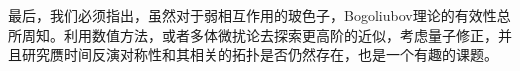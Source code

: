 最后，我们必须指出，虽然对于弱相互作用的玻色子，Bogoliubov理论的有效性总所周知。利用数值方法，或者多体微扰论去探索更高阶的近似，考虑量子修正，并且研究赝时间反演对称性和其相关的拓扑是否仍然存在，也是一个有趣的课题。
















































































































